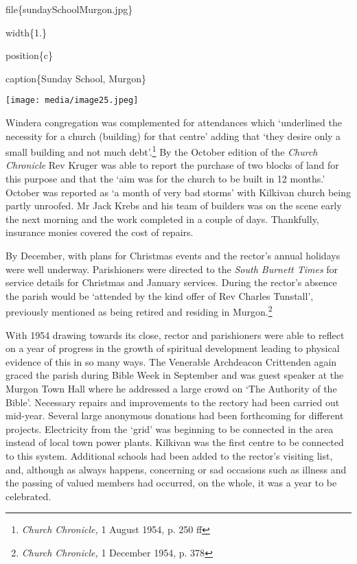 file\{sundaySchoolMurgon.jpg\}

width\{1.\}

position\{c\}

caption\{Sunday School, Murgon\}

\texttt{[image: media/image25.jpeg]}

Windera congregation was complemented for attendances which `underlined the necessity for a church (building) for that centre' adding that `they desire only a small building and not much debt'.\footnote{\emph{Church Chronicle,} 1 August 1954, p. 250 ff} By the October edition of the \emph{Church Chronicle} Rev Kruger was able to report the purchase of two blocks of land for this purpose and that the `aim was for the church to be built in 12 months.' October was reported as `a month of very bad storms' with Kilkivan church being partly unroofed. Mr Jack Krebs and his team of builders was on the scene early the next morning and the work completed in a couple of days. Thankfully, insurance monies covered the cost of repairs.

By December, with plans for Christmas events and the rector's annual holidays were well underway. Parishioners were directed to the \emph{South Burnett Times} for service details for Christmas and January services. During the rector's absence the parish would be `attended by the kind offer of Rev Charles Tunstall', previously mentioned as being retired and residing in Murgon.\footnote{\emph{Church Chronicle,} 1 December 1954, p. 378}

With 1954 drawing towards its close, rector and parishioners were able to reflect on a year of progress in the growth of spiritual development leading to physical evidence of this in so many ways. The Venerable Archdeacon Crittenden again graced the parish during Bible Week in September and was guest speaker at the Murgon Town Hall where he addressed a large crowd on `The Authority of the Bible'. Necessary repairs and improvements to the rectory had been carried out mid-year. Several large anonymous donations had been forthcoming for different projects. Electricity from the `grid' was beginning to be connected in the area instead of local town power plants. Kilkivan was the first centre to be connected to this system. Additional schools had been added to the rector's visiting list, and, although as always happens, concerning or sad occasions such as illness and the passing of valued members had occurred, on the whole, it was a year to be celebrated.

